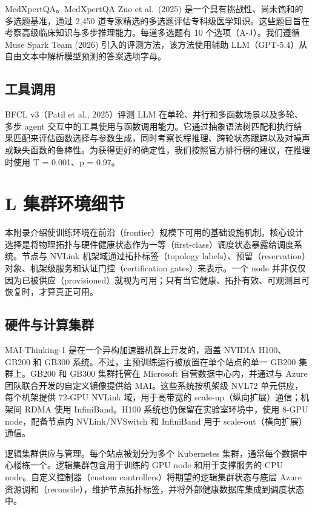 \documentclass[
  10
]{article}
\begin{document}
MedXpertQA。MedXpertQA Zuo et al.~(2025) 是一个具有挑战性、尚未饱和的多选题基准，通过 2,450 道专家精选的多选题评估专科级医学知识。这些题目旨在考察高级临床知识与多步推理能力。每道多选题有 10 个选项（A-J）。我们遵循 Muse Spark Team (2026) 引入的评测方法，该方法使用辅助 LLM（GPT-5.4）从自由文本中解析模型预测的答案选项字母。

\subsection{工具调用}\label{k.7-tool-calling}

BFCL v3（Patil et al., 2025）评测 LLM 在单轮、并行和多函数场景以及多轮、多步 agent 交互中的工具使用与函数调用能力。它通过抽象语法树匹配和执行结果匹配来评估函数选择与参数生成，同时考察长程推理、跨轮状态跟踪以及对噪声或缺失函数的鲁棒性。为获得更好的确定性，我们按照官方排行榜的建议，在推理时使用 T = 0.001、p = 0.97。

\section{L 集群环境细节}\label{l-cluster-environment-details}

本附录介绍使训练环境在前沿（frontier）规模下可用的基础设施机制。核心设计选择是将物理拓扑与硬件健康状态作为一等（first-class）调度状态暴露给调度系统。节点与 NVLink 机架域通过拓扑标签（topology labels）、预留（reservation）对象、机架级服务和认证门控（certification gates）来表示。一个 node 并非仅仅因为已被供应（provisioned）就视为可用；只有当它健康、拓扑有效、可观测且可恢复时，才算真正可用。

\subsection{硬件与计算集群}\label{l.1-hardware-and-compute-clusters}

MAI-Thinking-1 是在一个异构加速器机群上开发的，涵盖 NVIDIA H100、GB200 和 GB300 系统。不过，主预训练运行被放置在单个站点的单一 GB200 集群上。GB200 和 GB300 集群托管在 Microsoft 自营数据中心内，并通过与 Azure 团队联合开发的自定义镜像提供给 MAI。这些系统按机架级 NVL72 单元供应，每个机架提供 72-GPU NVLink 域，用于高带宽的 scale-up（纵向扩展）通信；机架间 RDMA 使用 InfiniBand。H100 系统也仍保留在实验室环境中，使用 8-GPU node，配备节点内 NVLink/NVSwitch 和 InfiniBand 用于 scale-out（横向扩展）通信。

逻辑集群供应与管理。每个站点被划分为多个 Kubernetes 集群，通常每个数据中心楼栋一个。逻辑集群包含用于训练的 GPU node 和用于支撑服务的 CPU node。自定义控制器（custom controllers）将期望的逻辑集群状态与底层 Azure 资源调和（reconcile），维护节点拓扑标签，并将外部健康数据库集成到调度状态中。
\end{document}
